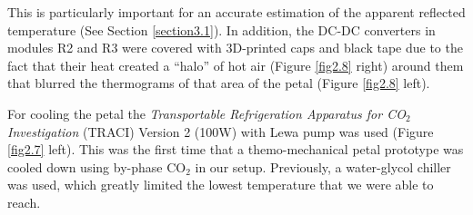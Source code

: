 		This is particularly important for an accurate estimation of the apparent reflected temperature (See Section \ref{section3.1}). In addition, the DC-DC converters in modules R2 and R3 were covered with 3D-printed caps and black tape due to the fact that their heat created a “halo” of hot air (Figure \ref{fig2.8} right) around them that blurred the thermograms of that area of the petal (Figure \ref{fig2.8} left).
		
		For cooling the petal the \textit{Transportable Refrigeration Apparatus for CO$_{2}$ Investigation} (TRACI) Version 2 (100W) with Lewa pump was used (Figure \ref{fig2.7} left). This was the first time that a themo-mechanical petal prototype was cooled down using by-phase CO$_{2}$ in our setup. Previously, a water-glycol chiller was used, which greatly limited the lowest temperature that we were able to reach.
	
